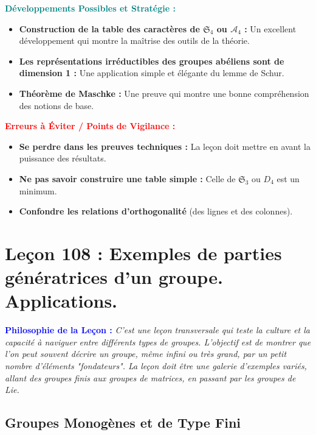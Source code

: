 \documentclass[12pt, a4paper, parskip=full]{report}
\theoremstyle{agregstyle}
\newenvironment{philosophie}
  {\par\medskip\noindent\begin{oframed}\noindent\textbf{\textcolor{blue}{Philosophie de la Leçon :}}\itshape}
  {\end{oframed}\par\medskip}
\newenvironment{developpements}
  {\par\medskip\noindent\begin{oframed}\noindent\textbf{\textcolor{teal}{Développements Possibles et Stratégie :}}}
  {\end{oframed}\par\medskip}
\newenvironment{erreurs}
  {\par\medskip\noindent\begin{oframed}\noindent\textbf{\textcolor{red}{Erreurs à Éviter / Points de Vigilance :}}}
  {\end{oframed}\par\medskip}
\begin{document}
\begin{developpements}
    \begin{itemize}
        \item \textbf{Construction de la table des caractères de $\mathfrak{S}_4$ ou $\mathcal{A}_4$ :} Un excellent développement qui montre la maîtrise des outils de la théorie.
        \item \textbf{Les représentations irréductibles des groupes abéliens sont de dimension 1 :} Une application simple et élégante du lemme de Schur.
        \item \textbf{Théorème de Maschke :} Une preuve qui montre une bonne compréhension des notions de base.
    \end{itemize}
\end{developpements}

\begin{erreurs}
    \begin{itemize}
        \item \textbf{Se perdre dans les preuves techniques :} La leçon doit mettre en avant la puissance des résultats.
        \item \textbf{Ne pas savoir construire une table simple :} Celle de $\mathfrak{S}_3$ ou $D_4$ est un minimum.
        \item \textbf{Confondre les relations d'orthogonalité} (des lignes et des colonnes).
    \end{itemize}
\end{erreurs}

\newpage
\chapter{Leçon 108 : Exemples de parties génératrices d'un groupe. Applications.}

\begin{philosophie}
    C'est une leçon transversale qui teste la culture et la capacité à naviguer entre différents types de groupes. L'objectif est de montrer que l'on peut souvent décrire un groupe, même infini ou très grand, par un petit nombre d'éléments "fondateurs". La leçon doit être une galerie d'exemples variés, allant des groupes finis aux groupes de matrices, en passant par les groupes de Lie.
\end{philosophie}

\section{Groupes Monogènes et de Type Fini}
\end{document}
